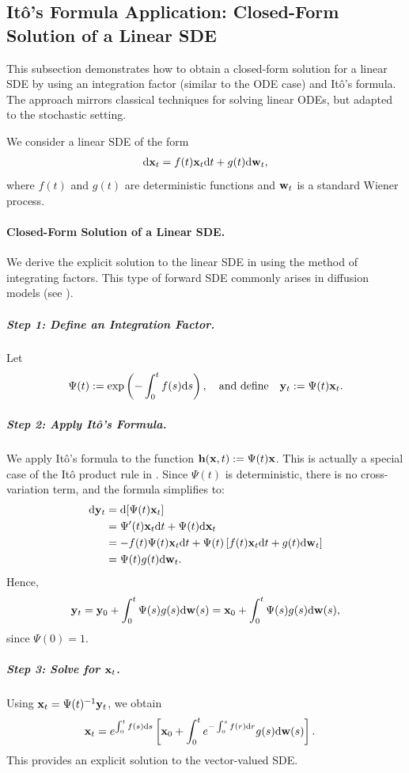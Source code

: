 \subsection{It\^o's Formula Application: Closed-Form Solution of a Linear SDE}\label{subsec:rigorous-proof-linear-sde}
This subsection demonstrates how to obtain a closed-form solution for a linear SDE by using an integration factor (similar to the ODE case) and It\^o's formula. The approach mirrors classical techniques for solving linear ODEs, but adapted to the stochastic setting.

We consider a linear SDE of the form
\begin{align}\label{eq:app-linear-sde}
    \mathrm{d}{\mathbf{x}}_t = f(t){\mathbf{x}}_t \mathrm{d}t + g(t) \mathrm{d}{\mathbf{w}}_t,
\end{align}
where $f(t)$ and $g(t)$ are deterministic functions and ${\mathbf{w}}_t$ is a standard Wiener process. 
\paragraph{Closed-Form Solution of a Linear SDE.} We derive the explicit solution to the linear SDE in  using the method of integrating factors. This type of forward SDE commonly arises in diffusion models (see ).


\subparagraph{Step 1: Define an Integration Factor.} Let
\[
\Psi(t) := \exp\left( -\int_0^t f(s) \mathrm{d}s \right),
\quad \text{and define} \quad
{\mathbf{y}}_t := \Psi(t){\mathbf{x}}_t.
\]
\subparagraph{Step 2: Apply It\^o's Formula.}  
We apply It\^o's formula to the function ${\mathbf{h}}({\mathbf{x}}, t) := \Psi(t){\mathbf{x}}$. This is actually a special case of the It\^o product rule in . Since $\Psi(t)$ is deterministic, there is no cross-variation term, and the formula simplifies to:
\begin{align*}
    \mathrm{d}{\mathbf{y}}_t 
    &= \mathrm{d}[\Psi(t){\mathbf{x}}_t] \\
    &= \Psi'(t){\mathbf{x}}_t \mathrm{d}t + \Psi(t) \mathrm{d}{\mathbf{x}}_t \\
    &= -f(t)\Psi(t){\mathbf{x}}_t \mathrm{d}t + \Psi(t)\left[f(t){\mathbf{x}}_t \mathrm{d}t + g(t) \mathrm{d}{\mathbf{w}}_t\right] \\
    &= \Psi(t)g(t) \mathrm{d}{\mathbf{w}}_t.
\end{align*}
Hence,
\[
{\mathbf{y}}_t = {\mathbf{y}}_0 + \int_0^t \Psi(s)g(s) \mathrm{d}{\mathbf{w}}(s) = {\mathbf{x}}_0 + \int_0^t \Psi(s)g(s) \mathrm{d}{\mathbf{w}}(s),
\]
since $\Psi(0) = 1$.
\subparagraph{Step 3: Solve for ${\mathbf{x}}_t$.}  
Using ${\mathbf{x}}_t = \Psi(t)^{-1}{\mathbf{y}}_t$, we obtain
\begin{align}\label{eq:lienar-sde-solution}
    {\mathbf{x}}_t &=  e^{ \int_0^t f(s)\mathrm{d}s}
    \left[ {\mathbf{x}}_0 + \int_0^t e^{ -\int_0^s f(r) \mathrm{d}r } g(s) \mathrm{d}{\mathbf{w}}(s) \right].
\end{align}
This provides an explicit solution to the vector-valued SDE.

